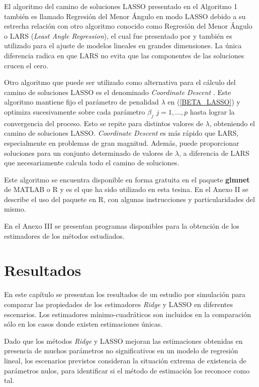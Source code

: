 \documentclass[a4paper,12pt]{report}
\begin{document}
\vspace{0.8cm}

El algoritmo del camino de soluciones LASSO presentado en el Algoritmo 1 también es llamado Regresión del Menor Ángulo en modo LASSO debido a su estrecha relación con otro algoritmo conocido como Regresión del Menor Ángulo o LARS (\textit{Least Angle Regression}), el cual fue presentado por \citet{efron2004least} y también es utilizado para el ajuste de modelos lineales en grandes dimensiones. La única diferencia radica en que LARS no evita que las componentes de las soluciones crucen el cero.

Otro algoritmo que puede ser utilizado como alternativa para el cálculo del camino de soluciones LASSO es el denominado \textit{Coordinate Descent} \citep{friedman2007pathwise} \citep{friedman2010regularization}. Este algoritmo mantiene fijo el parámetro de penalidad $\lambda$ en (\ref{BETA_LASSO}) y optimiza sucesivamente sobre cada parámetro $\beta_j$ $j=1,...,p$ hasta lograr la convergencia del proceso. Esto se repite para distintos valores de $\lambda$, obteniendo el camino de soluciones LASSO. \textit{Coordinate Descent} es más rápido que LARS, especialmente en problemas de gran magnitud. Además, puede proporcionar soluciones para un conjunto determinado de valores de $\lambda$, a diferencia de LARS que necesariamente calcula todo el camino de soluciones.

Este algoritmo se encuentra disponible en forma gratuita en el paquete \textbf{glmnet} de MATLAB o R \citep{friedman2009glmnet} y es el que ha sido utilizado en esta tesina. En el Anexo II se describe el uso del paquete en R, con algunas instrucciones y particularidades del mismo. 

En el Anexo III se presentan programas disponibles para la obtención de los estimadores de los métodos estudiados.

\chapter{Resultados}
En este capítulo se presentan los resultados de un estudio por simulación para comparar las propiedades de los estimadores \textit{Ridge} y LASSO en diferentes escenarios. Los estimadores mínimo-cuadráticos son incluidos en la comparación sólo en los casos donde existen estimaciones únicas.

Dado que los métodos \textit{Ridge} y LASSO mejoran las estimaciones obtenidas en presencia de muchos parámetros no significativos en un modelo de regresión lineal, los escenarios previstos consideran la situación extrema de existencia de parámetros nulos, para identificar si el método de estimación los reconoce como tal.
\end{document}
